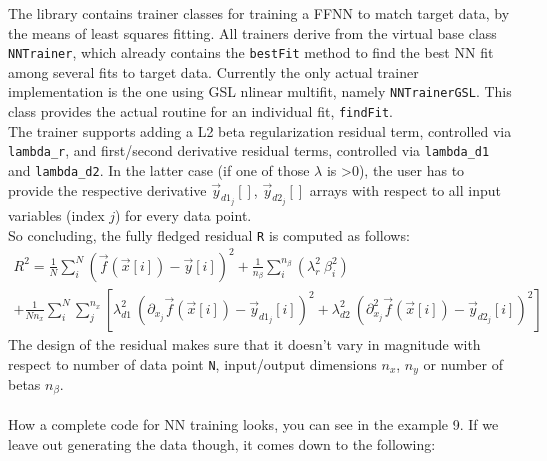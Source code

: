 \documentclass[11pt,a4paper,twoside]{article}
\begin{document}
The library contains trainer classes for training a FFNN to match target data,
by the means of least squares fitting. All trainers derive from the virtual base class
\verb+NNTrainer+, which already contains the \verb+bestFit+ method to find the
best NN fit among several fits to target data.
Currently the only actual trainer implementation is the one using GSL nlinear
multifit, namely \verb+NNTrainerGSL+. This class provides the actual routine for
an individual fit, \verb+findFit+.
\\The trainer supports adding a L2 beta regularization residual term, controlled via
\verb+lambda_r+, and first/second derivative residual terms, controlled via
\verb+lambda_d1+ and \verb+lambda_d2+. In the latter case (if one of those
$\lambda$ is >0), the user has to
provide the respective derivative $\vec{y}_{d1_j}[]$, $\vec{y}_{d2_j}[]$ arrays with respect to all
input variables (index $j$) for every data point.
\\So concluding, the fully fledged residual \verb+R+ is computed as follows:
\begin{multline*}
  R^2 = \frac{1}{N} \sum_i^N  \left(\vec{f}(\vec{x}[i]) - \vec{y}[i]\right)^2 + \frac{1}{n_{\beta}} \sum_i^{n_{\beta}} \left( \lambda_r^2\ \beta_i^2 \right) \\
    + \frac{1}{N n_x} \sum_i^N \sum_j^{n_x} \left[ \lambda_{d1}^2\ (\partial_{x_j} \vec{f}(\vec{x}[i]) - \vec{y}_{d1_j}[i])^2  + \lambda_{d2}^2\ (\partial_{x_j}^2 \vec{f}(\vec{x}[i]) - \vec{y}_{d2_j}[i])^2 \right]
\end{multline*}
The design of the residual makes sure that it doesn't vary in magnitude with
respect to number of data point \verb+N+, input/output dimensions $n_x$,
$n_y$ or number of betas $n_{\beta}$.
\\\\How a complete code for NN training looks, you can see in the example 9.
If we leave out generating the data though, it comes down to the following:
\end{document}
